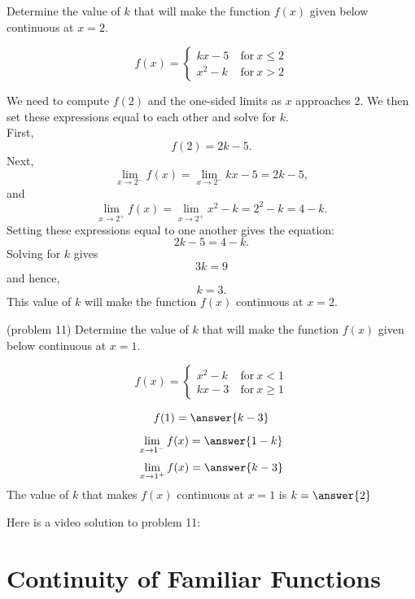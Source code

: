 \documentclass[handout]{ximera}
\begin{document}
\begin{example}[example 11]
Determine the value of $k$ that will make the function $f(x)$ given below 
continuous at $x = 2$.
 
\[f(x) = \left\{
     \begin{array}{lr}
       kx-5 & \ \text{for} \  x \leq 2 \\
			 x^2 - k & \ \text{for} \ x > 2
     \end{array}
   \right.
\]

We need to  compute $f(2)$ and the one-sided limits as $x$ approaches 2.
We then set these expressions equal to each other and solve for $k$.\\
First,
\[
f(2) = 2k-5.
\]
Next,
\[
\lim_{x \to 2^-} f(x) = \lim_{x \to 2^-} kx-5 = 2k-5,
\]
and
\[
\lim_{x \to 2^+} f(x) = \lim_{x \to 2^+} x^2 - k = 2^2 - k = 4 - k.
\]
Setting these expressions equal to one another gives the equation:
\[2k - 5 = 4 - k.\]
Solving for $k$ gives
\[3k = 9\]
and hence,
\[k = 3.\]
This value of $k$ will make the function $f(x)$ continuous at $x=2$.
\end{example}

\begin{problem}(problem 11)
Determine the value of $k$ that will make the function $f(x)$ given below 
continuous at $x = 1$.
 
\[f(x) = \left\{
     \begin{array}{lr}
        x^2 - k & \ \text{for} \  x < 1 \\
			 kx-3 & \ \text{for} \ x \geq 1
     \end{array}
   \right.
\]

\[
f(1) = \answer{k-3}
\]
\[
\lim_{x \to 1^-} f(x) = \answer{1-k}
\]
\[
\lim_{x \to 1^+} f(x) = \answer{k-3}
\]
The value of $k$ that makes $f(x)$ continuous at $x = 1$ is
$k = \answer{2}$
\end{problem}

Here is a video solution to problem 11:
\begin{foldable}
\end{foldable}


\section{Continuity of Familiar Functions}
\end{document}
